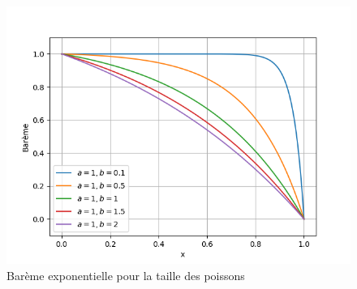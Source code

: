 \begin{figure}[h]
    \centering
    \includegraphics[width=0.75\linewidth]{fig/exp_poisson.png}
    \caption{Barème exponentielle pour la taille des poissons}
    \label{fig:exp_poisson}
\end{figure}

